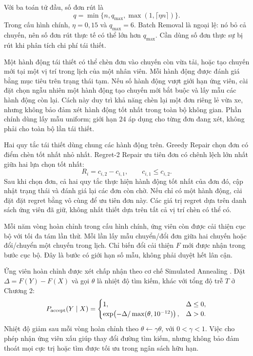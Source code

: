 Với ba toán tử đầu, số đơn rút là
\begin{equation}
 q=\min\{n,q_{\max},\max(1,\lceil\eta n\rceil)\}.\label{eq:removal-size}
\end{equation}
Trong cấu hình chính, $\eta=0{,}15$ và $q_{\max}=6$. Batch Removal là ngoại lệ: nó bỏ cả chuyến, nên số đơn rút thực tế có thể lớn hơn $q_{\max}$. Cần dùng số đơn thực sự bị rút khi phân tích chi phí tái thiết.

Một hành động tái thiết có thể chèn đơn vào chuyến còn vừa tải, hoặc tạo chuyến mới tại một vị trí trong lịch của một nhân viên. Mỗi hành động được đánh giá bằng mục tiêu trên trạng thái tạm. Nếu số hành động vượt giới hạn ứng viên, cài đặt chọn ngẫu nhiên một hành động tạo chuyến mới bắt buộc và lấy mẫu các hành động còn lại. Cách này duy trì khả năng chèn lại một đơn riêng lẻ vừa xe, nhưng không bảo đảm xét hành động tốt nhất trong toàn bộ không gian. Phần chính dùng lấy mẫu uniform; giới hạn $24$ áp dụng cho từng đơn đang xét, không phải cho toàn bộ lần tái thiết.

Hai quy tắc tái thiết dùng chung các hành động trên. Greedy Repair chọn đơn có điểm chèn tốt nhất nhỏ nhất. Regret-2 Repair ưu tiên đơn có chênh lệch lớn nhất giữa hai lựa chọn tốt nhất:
\begin{equation}
 R_i=c_{i,2}-c_{i,1},\qquad c_{i,1}\leq c_{i,2}.\label{eq:regret-two}
\end{equation}
Sau khi chọn đơn, cả hai quy tắc thực hiện hành động tốt nhất của đơn đó, cập nhật trạng thái và đánh giá lại các đơn còn chờ. Nếu chỉ có một hành động, cài đặt đặt regret bằng vô cùng để ưu tiên đơn này. Các giá trị regret dựa trên danh sách ứng viên đã giữ, không nhất thiết dựa trên tất cả vị trí chèn có thể có.

Mỗi năm vòng hoàn chỉnh trong cấu hình chính, ứng viên còn được cải thiện cục bộ với tối đa tám lần thử. Mỗi lần lấy mẫu chuyển/đổi đơn giữa hai chuyến hoặc đổi/chuyển một chuyến trong lịch. Chỉ biến đổi cải thiện $F$ mới được nhận trong bước cục bộ. Đây là bước có giới hạn số mẫu, không phải duyệt hết lân cận.

Ứng viên hoàn chỉnh được xét chấp nhận theo cơ chế Simulated Annealing \cite{kirkpatrick1983}. Đặt $\Delta=F(Y)-F(X)$ và gọi $\theta$ là nhiệt độ tìm kiếm, khác với tổng độ trễ $T$ ở Chương 2:
\begin{equation}
 P_{\rm accept}(Y\mid X)=
 \begin{cases}1,&\Delta\leq0,\\
 \exp\!\left(-\Delta/\max(\theta,10^{-12})\right),&\Delta>0.
 \end{cases}\label{eq:sa-acceptance}
\end{equation}
Nhiệt độ giảm sau mỗi vòng hoàn chỉnh theo $\theta\leftarrow\gamma\theta$, với $0<\gamma<1$. Việc cho phép nhận ứng viên xấu giúp thay đổi đường tìm kiếm, nhưng không bảo đảm thoát mọi cực trị hoặc tìm được tối ưu trong ngân sách hữu hạn.

